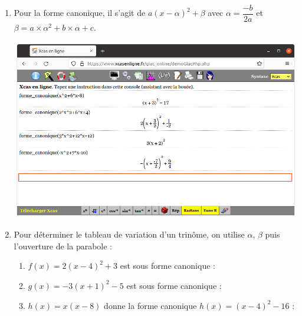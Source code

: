 \documentclass[a4paper,11pt]{article}
\begin{document}
%
\begin{enumerate}
	\item Pour la forme canonique, il s'agit de $a(x-\alpha)^2+\beta$ avec $\alpha=\dfrac{-b}{2a}$ et $\beta=a \times \alpha^2 + b \times \alpha + c$.
	\begin{center}
		\includegraphics[scale=0.3]{chap01_exos_corr_a}
	\end{center}
	\item Pour déterminer le tableau de variation d'un trinôme, on utilise $\alpha$, $\beta$ puis l'\og ouverture \fg{} de la parabole :
	\begin{enumerate}
		\item $f(x)=2(x-4)^2+3$ est sous forme canonique :
		\begin{center}
		\end{center}
		\item $g(x)=-3(x+1)^2-5$ est sous forme canonique :
		\begin{center}
		\end{center}
		\item $h(x)=x(x-8)$ donne la forme canonique $h(x)=(x-4)^2-16$ :
		\begin{center}
			\begin{tikzpicture}

\end{tikzpicture}
\end{center}
\end{enumerate}
\end{enumerate}
\end{document}
